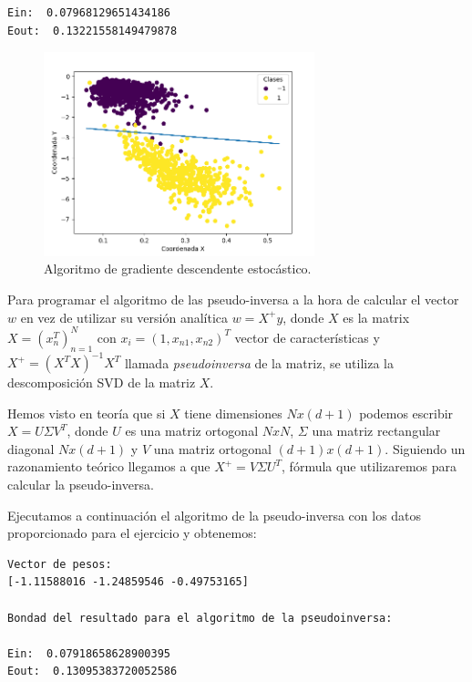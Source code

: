 \documentclass[size=a4, parskip=half, titlepage=false, toc=flat, toc=bib, 12pt]{scrartcl}
\begin{document}
\begin{enumerate}
\begin{itemize}
\begin{lstlisting}
Ein:  0.07968129651434186
Eout:  0.13221558149479878
\end{lstlisting}
\end{itemize}
\begin{figure}[H]
\centering
\includegraphics[width=0.7\textwidth]{./img/ej21}
\caption{Algoritmo de gradiente descendente estocástico.}
\end{figure}

Para programar el algoritmo de las pseudo-inversa a la hora de calcular el vector $w$ en vez de
utilizar su versión analítica $w = X^{+}y$, donde $X$ es la matrix $X = (x_n^T)_{n=1}^N$
con $x_i = (1, x_{n1}, x_{n2})^T$ vector de características y $X^{+} =(X^TX)^{-1}X^T$ llamada \textit{pseudoinversa}
de la matriz, se utiliza la descomposición SVD de la matriz $X$.

Hemos visto en teoría que si $X$ tiene dimensiones $N x (d + 1)$ podemos escribir $X = U \Sigma V^T$, donde
$U$ es una matriz ortogonal $NxN$, $\Sigma$ una matriz rectangular diagonal $N x (d+1)$ y $V$ una matriz ortogonal
$(d+1) x (d + 1)$. Siguiendo un razonamiento teórico llegamos a que $X^{+} = V \Sigma U^T $, fórmula que utilizaremos
para calcular la pseudo-inversa.

Ejecutamos a continuación el algoritmo de la pseudo-inversa con los datos proporcionado para
el ejercicio y obtenemos:
\begin{lstlisting}
Vector de pesos:
[-1.11588016 -1.24859546 -0.49753165]

Bondad del resultado para el algoritmo de la pseudoinversa:

Ein:  0.07918658628900395
Eout:  0.13095383720052586
\end{lstlisting}


\end{enumerate}
\end{document}
